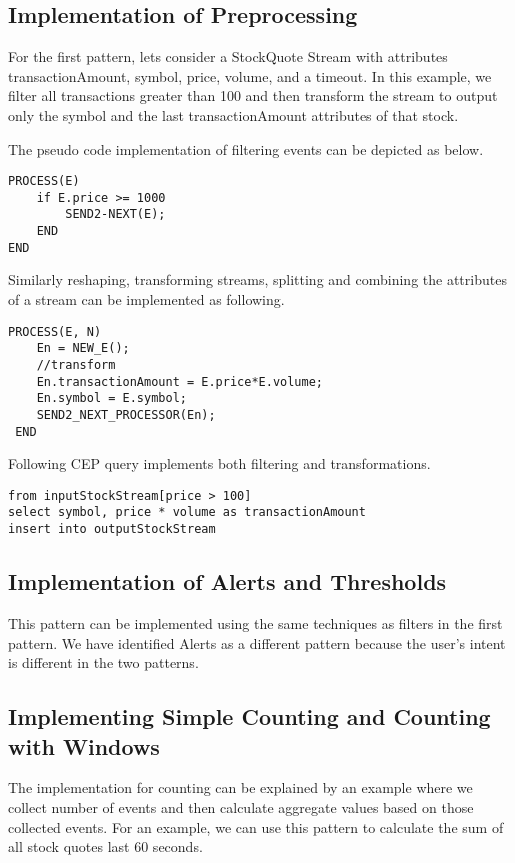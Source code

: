 \documentclass{sig-alternate}
\begin{document}
{\subsection{Implementation of Preprocessing}

For the first pattern, lets consider a StockQuote Stream with attributes transactionAmount, symbol, price, volume, and a timeout. In this example, we filter all transactions greater than 100 and then transform the stream to output only the symbol and the last transactionAmount attributes of that stock. 

The pseudo code implementation of filtering events can be depicted as below. 


\begin{lstlisting}[mathescape, showstringspaces=false]
PROCESS(E) 
	if E.price >= 1000
		SEND2-NEXT(E); 
	END
END
\end{lstlisting}


Similarly reshaping, transforming streams, splitting and combining the attributes of a stream can be implemented as following.

\begin{lstlisting}[mathescape, showstringspaces=false]
PROCESS(E, N) 
	En = NEW_E(); 
	//transform
	En.transactionAmount = E.price*E.volume;
	En.symbol = E.symbol;
	SEND2_NEXT_PROCESSOR(En); 
 END
\end{lstlisting}


Following CEP query implements both filtering and transformations. 

\begin{lstlisting}[mathescape, showstringspaces=false]
from inputStockStream[price > 100]
select symbol, price * volume as transactionAmount
insert into outputStockStream 
\end{lstlisting}



\subsection{Implementation of Alerts and Thresholds}
This pattern can be implemented using the same techniques as filters in the first pattern. We have identified Alerts as a different pattern because the user's intent is different in the two patterns. 


\subsection{Implementing Simple Counting and Counting with Windows}
The implementation for counting can be explained by an example where we collect number of events and then calculate aggregate values based on those collected events. For an example, we can use this pattern to calculate the sum of all stock quotes last 60 seconds. 

}
\end{document}
